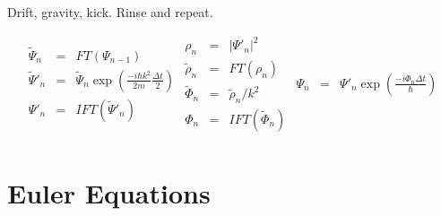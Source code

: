 \documentclass{article}
\begin{document}
Drift, gravity, kick. Rinse and repeat.

\begin{equation}
\begin{array}{rcl}
%
\tilde\Psi_n &=& FT(\Psi_{n-1}) \\
\tilde\Psi'_n &=& \tilde\Psi_n\exp(\frac{-i\hbar k^2}{2m}\frac{\Delta t}{2}) \\
\Psi'_n &=& IFT(\tilde\Psi'_n) \\
\end{array}
%
\begin{array}{rcl}
\rho_n &=& |\Psi'_n|^2 \\
\tilde\rho_n &=& FT(\rho_n) \\
\tilde\Phi_n &=& \tilde\rho_n / k^2 \\
\Phi_n &=& IFT( \tilde\Phi_n) \\
\end{array}
%
\begin{array}{rcl}
\Psi_n &=& \Psi'_n\exp(\frac{-i\Phi_n\Delta t}{\hbar}) \\
\end{array}
%
\end{equation}


\section{Euler Equations}
\end{document}

